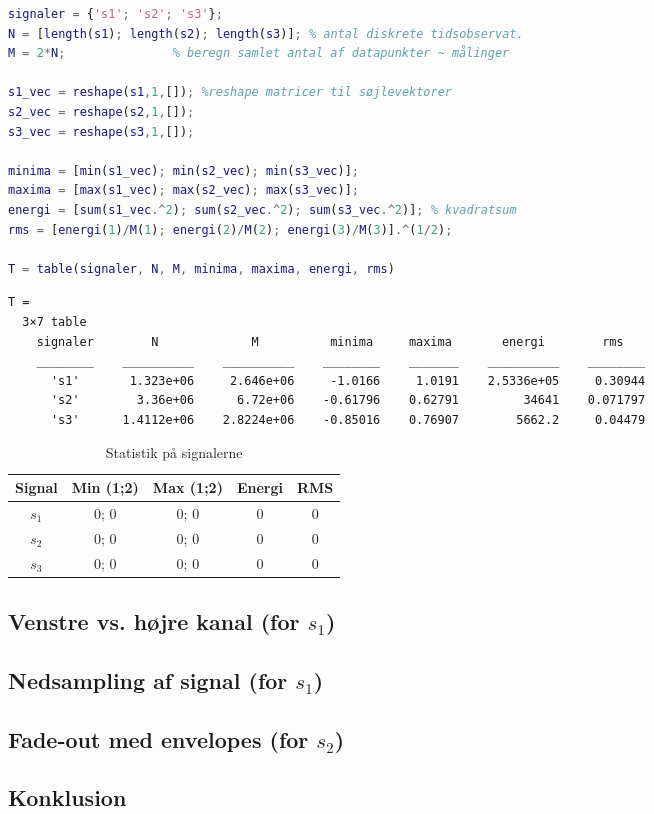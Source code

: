 \documentclass[a4paper]{report}
\begin{document}
\begin{lstlisting}[language=Matlab, style=Matlab-editor]
signaler = {'s1'; 's2'; 's3'};
N = [length(s1); length(s2); length(s3)]; % antal diskrete tidsobservat.
M = 2*N;               % beregn samlet antal af datapunkter ~ målinger

s1_vec = reshape(s1,1,[]); %reshape matricer til søjlevektorer
s2_vec = reshape(s2,1,[]);
s3_vec = reshape(s3,1,[]);

minima = [min(s1_vec); min(s2_vec); min(s3_vec)];
maxima = [max(s1_vec); max(s2_vec); max(s3_vec)];
energi = [sum(s1_vec.^2); sum(s2_vec.^2); sum(s3_vec.^2)]; % kvadratsum
rms = [energi(1)/M(1); energi(2)/M(2); energi(3)/M(3)].^(1/2);

T = table(signaler, N, M, minima, maxima, energi, rms)
\end{lstlisting}

        \color{lightgray} \begin{verbatim}T =
  3×7 table
    signaler        N             M          minima     maxima       energi        rms   
    ________    __________    __________    ________    _______    __________    ________
      's1'       1.323e+06     2.646e+06     -1.0166     1.0191    2.5336e+05     0.30944
      's2'        3.36e+06      6.72e+06    -0.61796    0.62791         34641    0.071797
      's3'      1.4112e+06    2.8224e+06    -0.85016    0.76907        5662.2     0.04479
\end{verbatim} \color{black}
    \begin{par}

\begin{table}[H]
\centering
\begin{tabular}{| c | c | c | c | c |} \hline
Signal & Min (1;2) & Max (1;2) & Energi & RMS \\ \hline
$s_1$ & 0; 0 & 0; 0 & 0 & 0 \\ \hline
$s_2$ & 0; 0 & 0; 0 & 0 & 0 \\ \hline
$s_3$ & 0; 0 & 0; 0 & 0 & 0 \\ \hline
\end{tabular}\caption{Statistik på signalerne}\label{tab:stat}\end{table}

\end{par} 



\section{Venstre vs. højre kanal (for $s_1$)}

        


\section{Nedsampling af signal (for $s_1$)}

        


\section{Fade-out med envelopes (for $s_2$)}

        \begin{par}
\chapter{Konklusion}
\end{par} 
\end{document}
